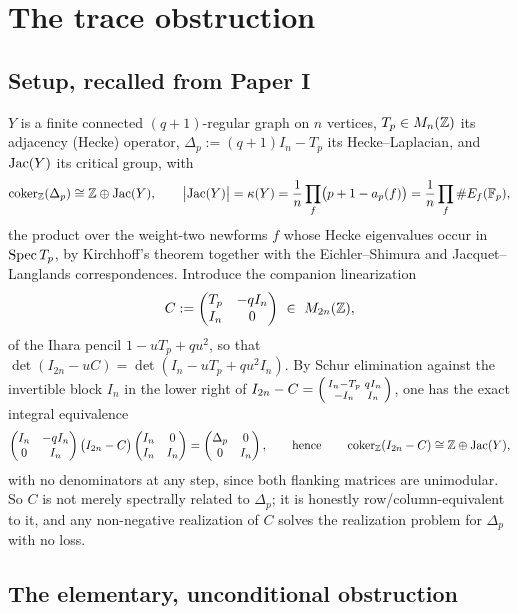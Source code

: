 \section{The trace obstruction}\label{II:sec:trace}

\subsection{Setup, recalled from Paper I}

$Y$ is a finite connected $(q+1)$-regular graph on $n$ vertices, $T_p\in M_n(\mathbb{Z})$ its
adjacency (Hecke) operator, $\Delta_p:=(q+1)I_n-T_p$ its Hecke--Laplacian, and
$\operatorname{Jac}(Y)$ its critical group, with
\[
\operatorname{coker}_{\mathbb{Z}}(\Delta_p)\cong\mathbb{Z}\oplus\operatorname{Jac}(Y),\qquad
\bigl|\operatorname{Jac}(Y)\bigr|=\kappa(Y)=\frac1n\prod_{f}\bigl(p+1-a_p(f)\bigr)=\frac1n\prod_f\#E_f(\mathbb{F}_p),
\]
the product over the weight-two newforms $f$ whose Hecke eigenvalues occur in
$\operatorname{Spec} T_p$, by Kirchhoff's theorem together with the Eichler--Shimura and
Jacquet--Langlands correspondences. Introduce the companion linearization
\[
C:=\begin{pmatrix}T_p&-qI_n\\I_n&0\end{pmatrix}\ \in\ M_{2n}(\Z),
\]
of the Ihara pencil $1-uT_p+qu^2$, so that $\det(I_{2n}-uC)=\det(I_n-uT_p+qu^2I_n)$.
By Schur elimination against the invertible block $I_n$ in the lower right of
$I_{2n}-C=\begin{psmallmatrix}I_n-T_p&qI_n\\-I_n&I_n\end{psmallmatrix}$, one has the exact
integral equivalence
\[
\begin{pmatrix}I_n&-qI_n\\0&I_n\end{pmatrix}
\bigl(I_{2n}-C\bigr)
\begin{pmatrix}I_n&0\\I_n&I_n\end{pmatrix}
=\begin{pmatrix}\Delta_p&0\\0&I_n\end{pmatrix},
\qquad\text{hence}\qquad
\operatorname{coker}_{\mathbb{Z}}(I_{2n}-C)\cong\mathbb{Z}\oplus\operatorname{Jac}(Y),
\]
with no denominators at any step, since both flanking matrices are unimodular. So $C$ is
not merely spectrally related to $\Delta_p$; it is honestly row/column-equivalent to it,
and any non-negative realization of $C$ solves the realization problem for $\Delta_p$
with no loss.

\subsection{The elementary, unconditional obstruction}

